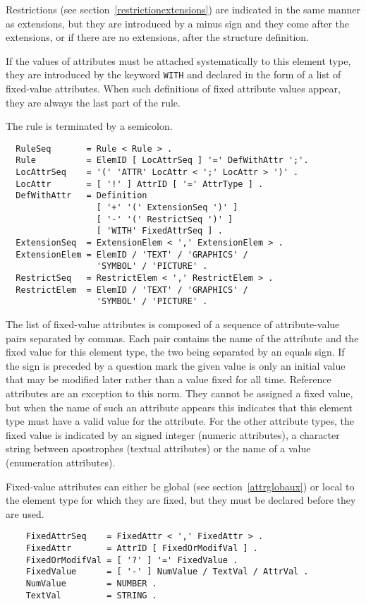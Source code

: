 Restrictions (see section~\ref{restrictionextensions}) are indicated in the same manner as extensions, but they
are introduced by a minus sign and they come after the extensions, or
if there are no extensions, after the structure definition.

If the values of attributes must be attached systematically to this
element type, they are introduced by the keyword {\tt WITH} and
declared in the form of a list of fixed-value attributes.  When such
definitions of fixed attribute values appear, they are always the last
part of the rule.

The rule is terminated by a semicolon.

\begin{verbatim}
  RuleSeq       = Rule < Rule > .
  Rule          = ElemID [ LocAttrSeq ] '=' DefWithAttr ';'.
  LocAttrSeq    = '(' 'ATTR' LocAttr < ';' LocAttr > ')' .
  LocAttr       = [ '!' ] AttrID [ '=' AttrType ] .
  DefWithAttr   = Definition
                  [ '+' '(' ExtensionSeq ')' ]
                  [ '-' '(' RestrictSeq ')' ]
                  [ 'WITH' FixedAttrSeq ] .
  ExtensionSeq  = ExtensionElem < ',' ExtensionElem > .
  ExtensionElem = ElemID / 'TEXT' / 'GRAPHICS' /
                  'SYMBOL' / 'PICTURE' .
  RestrictSeq   = RestrictElem < ',' RestrictElem > .
  RestrictElem  = ElemID / 'TEXT' / 'GRAPHICS' /
                  'SYMBOL' / 'PICTURE' .
\end{verbatim}

The list of fixed-value attributes is composed of a sequence of
attribute-value pairs separated by commas.  Each pair contains the
name of the attribute and the fixed value for this element type, the
two being separated by an equals sign.  If the sign is preceded by a
question mark the given value is only an initial value that may be
modified later rather than a value fixed for all time.  Reference
attributes are an exception to this norm.  They cannot be assigned a
fixed value, but when the name of such an attribute appears this
indicates that this element type must have a valid value for the
attribute.  For the other attribute types, the fixed value is
indicated by an signed integer (numeric attributes), a character
string between apostrophes (textual attributes) or the name of a value
(enumeration attributes).

Fixed-value attributes can either be global (see
section~\ref{attrglobaux}) or local to the element type for which they
are fixed, but they must be declared before they are used.

\begin{verbatim}
    FixedAttrSeq    = FixedAttr < ',' FixedAttr > .
    FixedAttr       = AttrID [ FixedOrModifVal ] .
    FixedOrModifVal = [ '?' ] '=' FixedValue .
    FixedValue      = [ '-' ] NumValue / TextVal / AttrVal .
    NumValue        = NUMBER .
    TextVal         = STRING .
\end{verbatim}

